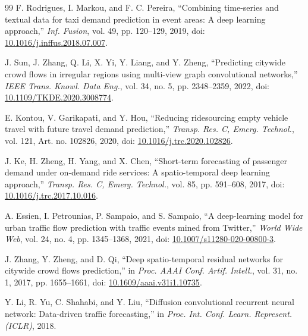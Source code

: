 \begingroup
\citationbibliographystyle
\linespread{1.05}\selectfont
\begin{thebibliography}{99}
\setlength{\itemsep}{3pt}
F. Rodrigues, I. Markou, and F. C. Pereira, ``Combining time-series and textual data for taxi demand prediction in event areas: A deep learning approach,'' \emph{Inf. Fusion}, vol. 49, pp. 120--129, 2019, doi: \href{https://doi.org/10.1016/j.inffus.2018.07.007}{10.1016/j.inffus.2018.07.007}.

J. Sun, J. Zhang, Q. Li, X. Yi, Y. Liang, and Y. Zheng, ``Predicting citywide crowd flows in irregular regions using multi-view graph convolutional networks,'' \emph{IEEE Trans. Knowl. Data Eng.}, vol. 34, no. 5, pp. 2348--2359, 2022, doi: \href{https://doi.org/10.1109/TKDE.2020.3008774}{10.1109/TKDE.2020.3008774}.

E. Kontou, V. Garikapati, and Y. Hou, ``Reducing ridesourcing empty vehicle travel with future travel demand prediction,'' \emph{Transp. Res. C, Emerg. Technol.}, vol. 121, Art. no. 102826, 2020, doi: \href{https://doi.org/10.1016/j.trc.2020.102826}{10.1016/j.trc.2020.102826}.

J. Ke, H. Zheng, H. Yang, and X. Chen, ``Short-term forecasting of passenger demand under on-demand ride services: A spatio-temporal deep learning approach,'' \emph{Transp. Res. C, Emerg. Technol.}, vol. 85, pp. 591--608, 2017, doi: \href{https://doi.org/10.1016/j.trc.2017.10.016}{10.1016/j.trc.2017.10.016}.

A. Essien, I. Petrounias, P. Sampaio, and S. Sampaio, ``A deep-learning model for urban traffic flow prediction with traffic events mined from Twitter,'' \emph{World Wide Web}, vol. 24, no. 4, pp. 1345--1368, 2021, doi: \href{https://doi.org/10.1007/s11280-020-00800-3}{10.1007/s11280-020-00800-3}.

J. Zhang, Y. Zheng, and D. Qi, ``Deep spatio-temporal residual networks for citywide crowd flows prediction,'' in \emph{Proc. AAAI Conf. Artif. Intell.}, vol. 31, no. 1, 2017, pp. 1655--1661, doi: \href{https://doi.org/10.1609/aaai.v31i1.10735}{10.1609/aaai.v31i1.10735}.

Y. Li, R. Yu, C. Shahabi, and Y. Liu, ``Diffusion convolutional recurrent neural network: Data-driven traffic forecasting,'' in \emph{Proc. Int. Conf. Learn. Represent. (ICLR)}, 2018.


\end{thebibliography}
